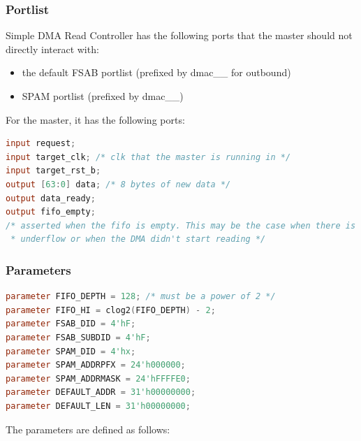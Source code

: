 \documentclass[10pt]{report}
\begin{document}
\subsubsection{Portlist}

Simple DMA Read Controller has the following ports that the master should
not directly interact with:

\begin{itemize}
\item{the default FSAB portlist (prefixed by dmac\_\_ for outbound)}
\item{SPAM portlist (prefixed by dmac\_\_)}
\end{itemize}

For the master, it has the following ports:

\begin{lstlisting}[basicstyle=\footnotesize,language=Verilog]
input request; 
input target_clk; /* clk that the master is running in */
input target_rst_b;
output [63:0] data; /* 8 bytes of new data */
output data_ready;
output fifo_empty; 
/* asserted when the fifo is empty. This may be the case when there is an
 * underflow or when the DMA didn't start reading */
\end{lstlisting}

\subsubsection{Parameters}

\begin{lstlisting}[basicstyle=\footnotesize,language=Verilog]
parameter FIFO_DEPTH = 128; /* must be a power of 2 */
parameter FIFO_HI = clog2(FIFO_DEPTH) - 2;
parameter FSAB_DID = 4'hF;
parameter FSAB_SUBDID = 4'hF;
parameter SPAM_DID = 4'hx;
parameter SPAM_ADDRPFX = 24'h000000;
parameter SPAM_ADDRMASK = 24'hFFFFE0;
parameter DEFAULT_ADDR = 31'h00000000;
parameter DEFAULT_LEN = 31'h00000000;
\end{lstlisting}

The parameters are defined as follows:
\end{document}
